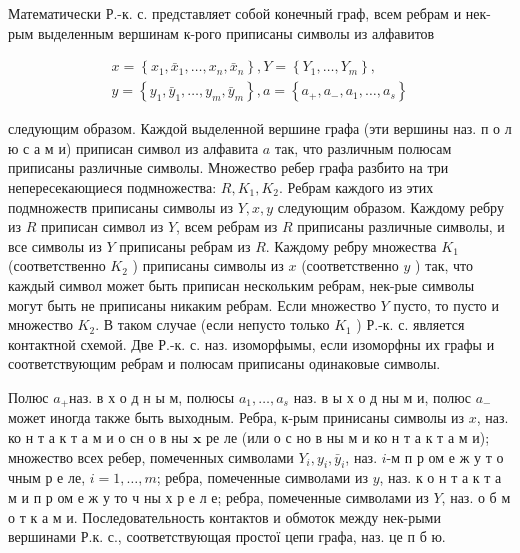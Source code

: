 \documentclass[10pt]{article}
\begin{document}
Математически Р.-к. с. представляет собой конечный граф, всем ребрам и нек-рым выделенным вершинам к-рого приписаны символы из алфавитов



\[

\begin{gathered}

x=\left\{x_{1}, \bar{x}_{1}, \ldots, x_{n}, \bar{x}_{n}\right\}, Y=\left\{Y_{1}, \ldots, Y_{m}\right\}, \\

y=\left\{y_{1}, \bar{y}_{1}, \ldots, y_{m}, \bar{y}_{m}\right\}, a=\left\{a_{+}, a_{-}, a_{1}, \ldots, a_{s}\right\}

\end{gathered}

\]



следующим образом. Каждой выделенной вершине графа (эти вершины наз. п о л ю с а м и) приписан символ из алфавита $a$ так, что различным полюсам приписаны различные символы. Множество ребер графа разбито на три непересекающиеся подмножества: $R, K_{1}, K_{2}$. Ребрам каждого из этих подмножеств приписаны символы из $Y, x, y$ следующим образом. Каждому ребру из $R$ приписан символ из $Y$, всем ребрам из $R$ приписаны различные символы, и все символы из $Y$ приписаны ребрам из $R$. Каждому ребру множества $K_{1}$ (соответственно $K_{2}$ ) приписаны символы из $x$ (соответственно $y$ ) так, что каждый символ может быть приписан нескольким ребрам, нек-рые символы могут быть не приписаны никаким ребрам. Если множество $Y$ пусто, то пусто и множество $K_{2}$. В таком случае (если непусто только $K_{1}$ ) Р.-к. с. является контактной схемой. Две Р.-к. с. наз. изоморфымы, если изоморфны их графы и соответствующим ребрам и полюсам приписаны одинаковые символы.



Полюс $a_{+}$наз. в х о д н ы м, полюсы $a_{1}, \ldots, a_{s}$ наз. в ы х о д ны м и, полюс $a_{-}$может иногда также быть выходным. Ребра, к-рым принисаны символы из $x$, наз. ко н т а к т а м и о сн о в ны $\mathbf{x}$ ре ле (или о с но в ны м и ко н т а к т а м и); множество всех ребер, помеченных символами $Y_{i}, y_{i}, \bar{y}_{i}$, наз. $i$-м п р ом е ж у т о чным р е ле, $i=1, \ldots, m$; ребра, помеченные символами из $y$, наз. к о н т а к т а м и п р ом е ж у то ч ны х р е л е; ребра, помеченные символами из $Y$, наз. о б м о т к а м и. Последовательность контактов и обмоток между нек-рыми вершинами Р.к. с., соответствующая простої цепи графа, наз. це п б ю.
\end{document}
